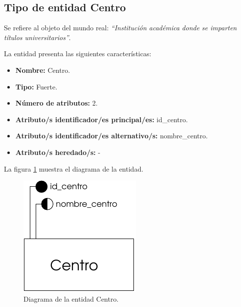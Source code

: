 \subsection{Tipo de entidad Centro}

   \begin{description}

   \item[Definición] Se refiere al objeto del mundo real: \emph{``Institución académica donde se imparten títulos universitarios''}.

   \item[Características] La entidad presenta las siguientes características:
      \begin{itemize}
         \item \textbf{Nombre:} Centro.
         \item \textbf{Tipo:} Fuerte.
         \item \textbf{Número de atributos:} 2.
         \item \textbf{Atributo/s identificador/es principal/es:} id\_centro.
         \item \textbf{Atributo/s identificador/es alternativo/s:} nombre\_centro.
         \item \textbf{Atributo/s heredado/s:} -
      \end{itemize}

   \item[Diagrama] La figura \ref{diagramaCentro} muestra el diagrama de la entidad.
   \item \begin{figure}[!ht]
            \begin{center}
            \includegraphics[]{07.Modelo_Entidad-Interrelacion/7.2.Analisis_Entidades/diagramas/centro.pdf}
            \caption{Diagrama de la entidad Centro.}
            \label{diagramaCentro}
            \end{center}
         \end{figure}


\end{description}

